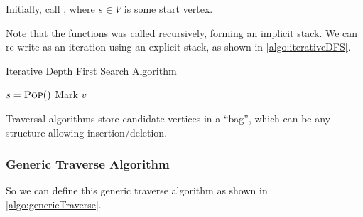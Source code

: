 Initially, call ,
where $s \in V$ is some start vertex.

Note that the functions was called recursively, forming an implicit stack.
We can re-write as an iteration using an explicit stack,
as shown in \cref{algo:iterativeDFS}.

\begin{algorithm}[H]
    \caption{Iterative Depth First Search Algorithm}\label{algo:iterativeDFS}
    \begin{algorithmic}[1]
            \State{}
                \State $s = \textsc{Pop} ()$
                    \State Mark $v$
                            \State{}
                        \EndIf
                    \EndFor
                \EndIf
            \EndWhile
        \EndProcedure
    \end{algorithmic}
\end{algorithm}

\observation
Traversal algorithms store candidate vertices in a ``bag'',
which can be any structure allowing insertion/deletion.

\subsubsection{Generic Traverse Algorithm}

So we can define this generic traverse algorithm
as shown in \cref{algo:genericTraverse}.


